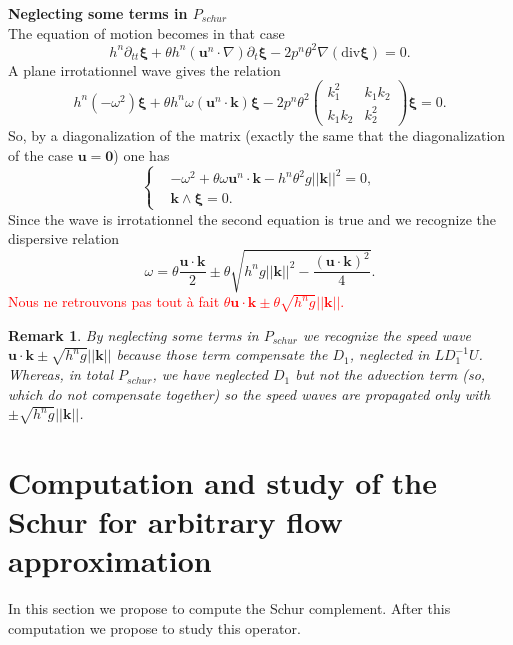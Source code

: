 \documentclass[a4paper, 11pt]{article}
\newtheorem{Remark}{Remark}
\begin{document}
\textbf{Neglecting some terms in $P_{schur}$}\\
The equation of motion becomes in that case
\begin{equation*}
h^n\partial_{tt}\boldsymbol{\xi}+\theta h^n\left(\boldsymbol{u}^n\cdot \nabla \right)\partial_t\boldsymbol{\xi}-2p^n\theta^2\nabla(\text{div}\boldsymbol{\xi})=0.
\end{equation*}
A plane irrotationnel wave gives the relation
\begin{equation*}
h^n(-\omega^2)\boldsymbol{\xi}+\theta h^n\omega (\boldsymbol{u}^n\cdot \boldsymbol{k})\boldsymbol{\xi}-2p^n\theta^2\begin{pmatrix}k_1^2&k_1k_2\\
k_1k_2&k_2^2\end{pmatrix}\boldsymbol{\xi}=0.
\end{equation*}
So, by a diagonalization of the matrix (exactly the same that the diagonalization of the case $\boldsymbol{u}=\boldsymbol{0}$) one has
\begin{equation*}
\left\{
\begin{split}
&-\omega^2+\theta \omega \boldsymbol{u}^n\cdot \boldsymbol{k}-h^n\theta^2g||\boldsymbol{k}||^2=0,\\
&\boldsymbol{k}\wedge\boldsymbol{\xi}=0.
\end{split}
\right.
\end{equation*}
Since the wave is irrotationnel the second equation is true and we recognize the dispersive relation
\begin{equation*}
\omega =\theta\frac{\boldsymbol{u}\cdot \boldsymbol{k}}{2}\pm\theta\sqrt{h^ng||\boldsymbol{k}||^2-\frac{(\boldsymbol{u}\cdot \boldsymbol{k})^2}{4}}.
\end{equation*}
\textcolor{red}{Nous ne retrouvons pas tout \`a fait $\theta\boldsymbol{u}\cdot \boldsymbol{k}\pm\theta\sqrt{h^ng}||\boldsymbol{k}||$.}
\begin{Remark}
By neglecting some terms in $P_{schur}$ we recognize the speed wave $\boldsymbol{u}\cdot \boldsymbol{k}\pm\sqrt{h^ng}||\boldsymbol{k}||$ because those term compensate the $D_1$, neglected in $LD_1^{-1}U$. Whereas, in total $P_{schur}$, we have neglected $D_1$ but not the advection term (so, which do not compensate together) so the speed waves are propagated only with $\pm\sqrt{h^ng}||\boldsymbol{k}||$.
\end{Remark}

\section{Computation and study of the Schur for arbitrary  flow approximation}
In this section we propose to compute the Schur complement. After this computation we propose to study this operator.
\end{document}
